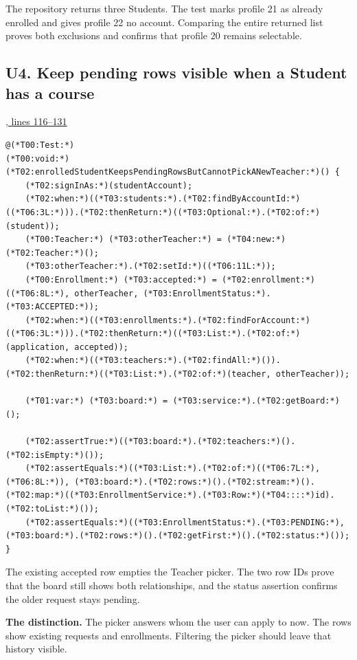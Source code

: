 The repository returns three Students. The test marks profile 21 as already
enrolled and gives profile 22 no account. Comparing the entire returned list
proves both exclusions and confirms that profile 20 remains selectable.

\subsection{U4. Keep pending rows visible when a Student has a course}
\par\smallskip
{\small\href{\repo/blob/5d22aed7f6d4ef1e4c0b0c0dabf2962ba4b47608/src/test/java/com/example/fmschool/EnrollmentServiceUnitTests.java#L116-L131}{, lines 116--131}}
\begin{lstlisting}[style=vsJava,firstnumber=116]
@(*T00:Test:*)
(*T00:void:*) (*T02:enrolledStudentKeepsPendingRowsButCannotPickANewTeacher:*)() {
    (*T02:signInAs:*)(studentAccount);
    (*T02:when:*)((*T03:students:*).(*T02:findByAccountId:*)((*T06:3L:*))).(*T02:thenReturn:*)((*T03:Optional:*).(*T02:of:*)(student));
    (*T00:Teacher:*) (*T03:otherTeacher:*) = (*T04:new:*) (*T02:Teacher:*)();
    (*T03:otherTeacher:*).(*T02:setId:*)((*T06:11L:*));
    (*T00:Enrollment:*) (*T03:accepted:*) = (*T02:enrollment:*)((*T06:8L:*), otherTeacher, (*T03:EnrollmentStatus:*).(*T03:ACCEPTED:*));
    (*T02:when:*)((*T03:enrollments:*).(*T02:findForAccount:*)((*T06:3L:*))).(*T02:thenReturn:*)((*T03:List:*).(*T02:of:*)(application, accepted));
    (*T02:when:*)((*T03:teachers:*).(*T02:findAll:*)()).(*T02:thenReturn:*)((*T03:List:*).(*T02:of:*)(teacher, otherTeacher));

    (*T01:var:*) (*T03:board:*) = (*T03:service:*).(*T02:getBoard:*)();

    (*T02:assertTrue:*)((*T03:board:*).(*T02:teachers:*)().(*T02:isEmpty:*)());
    (*T02:assertEquals:*)((*T03:List:*).(*T02:of:*)((*T06:7L:*), (*T06:8L:*)), (*T03:board:*).(*T02:rows:*)().(*T02:stream:*)().(*T02:map:*)((*T03:EnrollmentService:*).(*T03:Row:*)(*T04::::*)id).(*T02:toList:*)());
    (*T02:assertEquals:*)((*T03:EnrollmentStatus:*).(*T03:PENDING:*), (*T03:board:*).(*T02:rows:*)().(*T02:getFirst:*)().(*T02:status:*)());
}
\end{lstlisting}


The existing accepted row empties the Teacher picker. The two row IDs prove that
the board still shows both relationships, and the status assertion confirms the
older request stays pending.

\textbf{The distinction.}
The picker answers whom the user can apply to now. The rows show existing
requests and enrollments. Filtering the picker should leave that history visible.

